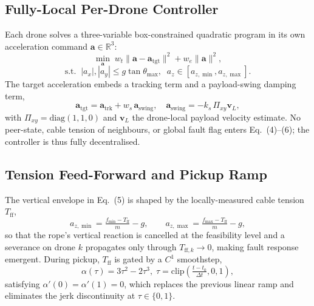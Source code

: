 \subsection{Fully-Local Per-Drone Controller}
Each drone solves a three-variable box-constrained quadratic program in its own acceleration command $\mathbf{a}\in\mathbb{R}^3$:
\begin{equation}
\min_{\mathbf{a}}\; w_t\|\mathbf{a}-\mathbf{a}_{\mathrm{tgt}}\|^2 + w_e\|\mathbf{a}\|^2,
\end{equation}
\begin{equation}
\text{s.t.}\;\;|a_x|,|a_y|\le g\tan\theta_{\max},\;\;a_z\in[a_{z,\min},a_{z,\max}].
\end{equation}
The target acceleration embeds a tracking term and a payload-swing damping term,
\begin{equation}
\mathbf{a}_{\mathrm{tgt}} = \mathbf{a}_{\mathrm{trk}} + w_s\,\mathbf{a}_{\mathrm{swing}},\quad \mathbf{a}_{\mathrm{swing}} = -k_s\,\Pi_{xy}\mathbf{v}_L,
\end{equation}
with $\Pi_{xy}=\mathrm{diag}(1,1,0)$ and $\mathbf{v}_L$ the drone-local payload velocity estimate. No peer-state, cable tension of neighbours, or global fault flag enters Eq.~(4)--(6); the controller is thus fully decentralised.

\subsection{Tension Feed-Forward and Pickup Ramp}
The vertical envelope in Eq.~(5) is shaped by the locally-measured cable tension $T_{\mathrm{ff}}$,
\begin{equation}
a_{z,\min}=\tfrac{f_{\min}-T_{\mathrm{ff}}}{m}-g,\qquad a_{z,\max}=\tfrac{f_{\max}-T_{\mathrm{ff}}}{m}-g,
\end{equation}
so that the rope's vertical reaction is cancelled at the feasibility level and a severance on drone $k$ propagates only through $T_{\mathrm{ff},k}\!\to\!0$, making fault response emergent. During pickup, $T_{\mathrm{ff}}$ is gated by a $C^1$ smoothstep,
\begin{equation}
\alpha(\tau)=3\tau^2-2\tau^3,\;\tau=\mathrm{clip}\!\left(\tfrac{t-t_0}{\Delta t},0,1\right),
\end{equation}
satisfying $\alpha'(0)=\alpha'(1)=0$, which replaces the previous linear ramp and eliminates the jerk discontinuity at $\tau\in\{0,1\}$.

